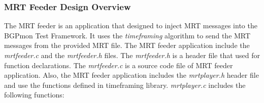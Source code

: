 







\subsubsection{MRT Feeder Design Overview}
\label{sec:mrtfeederdesign}

The MRT feeder is an application that designed to inject MRT messages into the BGPmon Test Framework. It uses the \emph{timeframing} algorithm to send the MRT messages from the provided MRT file.  The MRT feeder application include the \emph{mrtfeeder.c} and the \emph{mrtfeeder.h} files.  The \emph{mrtfeeder.h} is a header file that used for function declarations. The \emph{mrtfeeder.c} is a source code file of MRT feeder application.  Also, the MRT feeder application includes the  \emph{mrtplayer.h} header file and use the functions defined in timeframing library. \emph{mrtplayer.c} includes the  following functions: 

